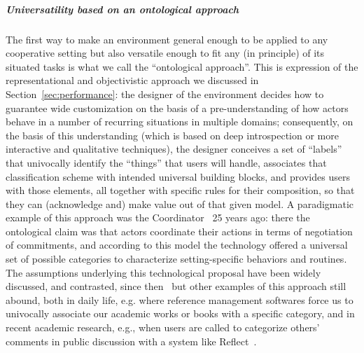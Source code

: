 \documentclass{article}
\begin{document}
\subparagraph{Universatility based on an ontological approach}

The first way to make an environment general enough to be applied to any cooperative setting but also versatile enough to fit any (in principle) of its situated tasks is what we call the ``ontological approach''. This is expression of the representational and objectivistic approach we discussed in Section~\ref{sec:performance}: the designer of the environment decides how to guarantee wide customization on the basis of a pre-understanding of how actors behave in a number of recurring situations in multiple domains; consequently, on the basis of this understanding (which is based on deep introspection or more interactive and qualitative techniques), the designer conceives a set of ``labels'' that univocally identify the ``things'' that users will handle, associates that classification scheme with intended universal building blocks, and provides users with those elements, all together with specific rules for their composition, so that they can (acknowledge and) make value out of that given model. A paradigmatic example of this approach was the Coordinator~\citep{flores_computer_1988} 25 years ago: there the ontological claim was that actors coordinate their actions in terms of negotiation of commitments, and according to this model the technology offered a universal set of possible categories to characterize setting-specific behaviors and routines. The assumptions underlying this technological proposal have been widely discussed, and contrasted, since then~\citep[e.g.,~][]{suchman_categories_1994} but other examples of this approach still abound, both in daily life, e.g. where reference management softwares force us to univocally associate our academic works or books with a specific category, and in recent academic research, e.g., when users are called to categorize others' comments in public discussion with a system like Reflect~\citep{kriplean_is_2012}. 
\end{document}
